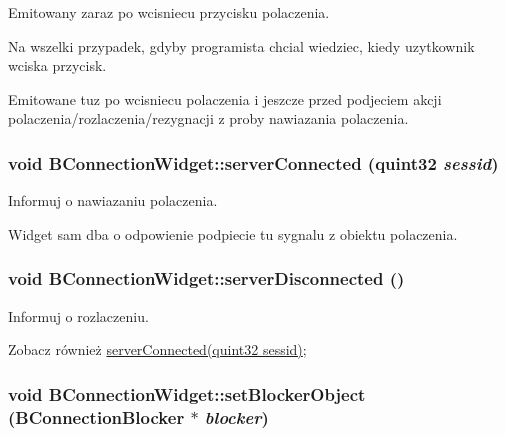 Emitowany zaraz po wcisniecu przycisku polaczenia. 

Na wszelki przypadek, gdyby programista chcial wiedziec, kiedy uzytkownik wciska przycisk.

Emitowane tuz po wcisniecu polaczenia i jeszcze przed podjeciem akcji polaczenia/rozlaczenia/rezygnacji z proby nawiazania polaczenia. \hypertarget{class_b_connection_widget_a7c9d3a266939c6719fe198f9b3d67636}{
\subsubsection[{serverConnected}]{\setlength{\rightskip}{0pt plus 5cm}void BConnectionWidget::serverConnected (quint32 {\em sessid})}}
\label{class_b_connection_widget_a7c9d3a266939c6719fe198f9b3d67636}


Informuj o nawiazaniu polaczenia. 

Widget sam dba o odpowienie podpiecie tu sygnalu z obiektu polaczenia. \hypertarget{class_b_connection_widget_a159829b06e46c68a354ec999d4b15b61}{
\subsubsection[{serverDisconnected}]{\setlength{\rightskip}{0pt plus 5cm}void BConnectionWidget::serverDisconnected ()}}
\label{class_b_connection_widget_a159829b06e46c68a354ec999d4b15b61}


Informuj o rozlaczeniu. 

\begin{DoxySeeAlso}{Zobacz również}
\hyperlink{class_b_connection_widget_a7c9d3a266939c6719fe198f9b3d67636}{serverConnected(quint32 sessid)}; 
\end{DoxySeeAlso}
\hypertarget{class_b_connection_widget_a976657d9910495a76d16b7c90d0b54fc}{
\subsubsection[{setBlockerObject}]{\setlength{\rightskip}{0pt plus 5cm}void BConnectionWidget::setBlockerObject ({\bf BConnectionBlocker} $\ast$ {\em blocker})}}
\label{class_b_connection_widget_a976657d9910495a76d16b7c90d0b54fc}


